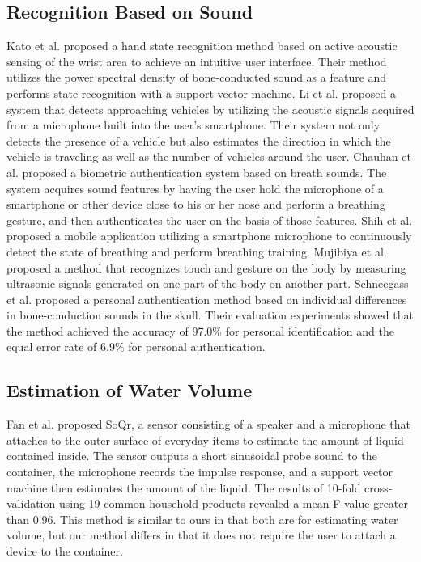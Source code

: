 \documentclass[sigconf]{acmart}
\begin{document}
\subsection{Recognition Based on Sound}
Kato et al. \cite{sound_sensing1} proposed a hand state recognition method based on active acoustic sensing of the wrist area to achieve an intuitive user interface. Their method utilizes the power spectral density of bone-conducted sound as a feature and performs state recognition with a support vector machine.
Li et al. \cite{Auto++} proposed a system that detects approaching vehicles by utilizing the acoustic signals acquired from a microphone built into the user's smartphone. Their system not only detects the presence of a vehicle but also estimates the direction in which the vehicle is traveling as well as the number of vehicles around the user.
Chauhan et al. \cite{BreathPrint} proposed a biometric authentication system based on breath sounds. The system acquires sound features by having the user hold the microphone of a smartphone or other device close to his or her nose and perform a breathing gesture, and then authenticates the user on the basis of those features.
Shih et al. \cite{Breeze} proposed a mobile application utilizing a smartphone microphone to continuously detect the state of breathing and perform breathing training.
Mujibiya et al. \cite{sound_sensing2} proposed a method that recognizes touch and gesture on the body by measuring ultrasonic signals generated on one part of the body on another part.
Schneegass et al. \cite{SkullConduct} proposed a personal authentication method based on individual differences in bone-conduction sounds in the skull. Their evaluation experiments showed that the method achieved the accuracy of 97.0\% for personal identification and the equal error rate of 6.9\% for personal authentication.


\subsection{Estimation of Water Volume}
Fan et al. \cite{SoQr} proposed SoQr, a sensor consisting of a speaker and a microphone that attaches to the outer surface of everyday items to estimate the amount of liquid contained inside. The sensor outputs a short sinusoidal probe sound to the container, the microphone records the impulse response, and a support vector machine then estimates the amount of the liquid. The results of 10-fold cross-validation using 19 common household products revealed a mean F-value greater than 0.96.
This method is similar to ours in that both are for estimating water volume, but our method differs in that it does not require the user to attach a device to the container.
\end{document}
